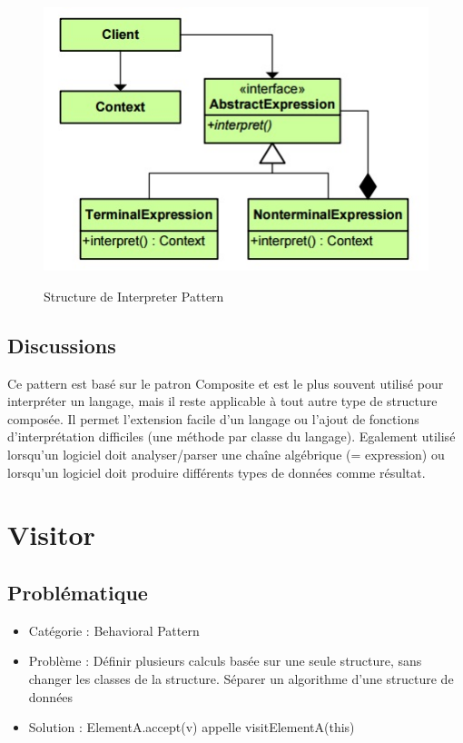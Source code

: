 \begin{figure}[!ht]
	\centering
	\begin{minipage}[t]{8.0cm}
		\includegraphics[scale=0.65]{Images/int.jpg}
		\label{s1}
   		\caption{Structure de Interpreter Pattern}
	\end{minipage}
	
\end{figure}


\subsection{Discussions}
Ce pattern est basé sur le patron Composite et est le plus souvent utilisé pour interpréter un langage, mais il reste applicable à tout autre type de structure composée. Il permet l'extension facile d'un langage ou l'ajout de fonctions d'interprétation difficiles (une méthode par classe du langage). Egalement utilisé lorsqu’un logiciel doit analyser/parser une chaîne algébrique (= expression) ou lorsqu’un logiciel doit produire différents types de données comme résultat.










\section{Visitor}
\subsection{Problématique}
\begin{itemize}
    \item Catégorie : Behavioral Pattern
    \item Problème : Définir plusieurs calculs basée sur une seule structure, sans changer les classes de la structure. Séparer un algorithme d’une structure de données
    \item Solution : ElementA.accept(v) appelle visitElementA(this)
\end{itemize}
